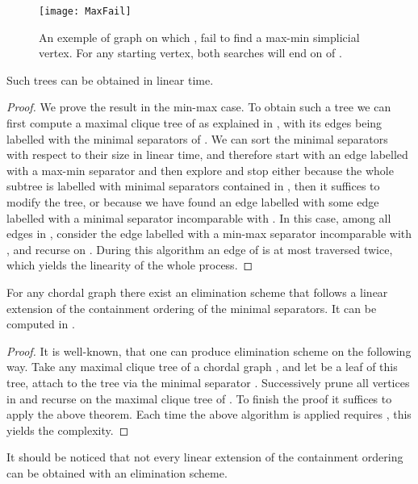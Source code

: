 \documentclass{endm}
\begin{document}
\begin{figure}[h!]
	\begin{center}
		\texttt{[image: MaxFail]}
	\caption{An exemple of graph on which ,  fail to find a max-min simplicial vertex.
	For any starting vertex, both searches will end on  of .}
	\label{fig:MaxFail}
	\end{center}
\end{figure}



\begin{corollary}
Such trees can be obtained in linear time.
\end{corollary}

\begin{proof}
We prove the result in the min-max case.
To obtain such a tree we can first compute a maximal clique tree  of  as explained in \cite{GHP95}, with its edges being labelled with the minimal separators of .
We can sort the minimal separators with respect to their size in linear time, and therefore start with an edge  labelled with a max-min separator  and then explore  and stop either because the whole subtree is labelled with minimal separators contained in , then it suffices to modify the tree,
or because we have found an edge labelled with some edge  labelled with a minimal separator  incomparable with . 
In this case, among all edges in , consider the edge  labelled with a min-max separator  incomparable with , and recurse on .
During this algorithm an edge of  is at most traversed twice, which yields the linearity of the whole process.
\end{proof}


\begin{corollary}
For any chordal graph there exist an elimination scheme that follows a linear extension of the containment ordering
of the minimal separators. It can be computed in .
\end{corollary}
\begin{proof}
It is well-known, that one can produce elimination scheme on the following way. Take any maximal  clique tree  of a chordal graph , and let  be a leaf of this tree, attach to the tree via the minimal separator . Successively prune all vertices in  and recurse on  the maximal clique tree of  . To finish the proof it suffices to apply the above theorem. Each time the above algorithm is applied requires , this yields the complexity.
\end{proof}

It should be noticed that not every linear extension of the  containment ordering can be obtained with an elimination scheme.
\end{document}
